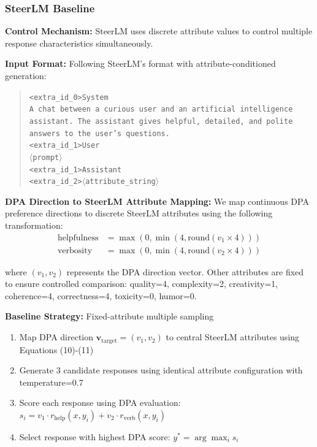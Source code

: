 \documentclass{article} %
\begin{document}
\subsubsection{SteerLM Baseline}

\textbf{Control Mechanism:} SteerLM uses discrete attribute values to control multiple response characteristics simultaneously.

\textbf{Input Format:} Following SteerLM's format with attribute-conditioned generation:
\begin{quote}
\texttt{<extra\_id\_0>System} \\
\texttt{A chat between a curious user and an artificial intelligence assistant. The assistant gives helpful, detailed, and polite answers to the user's questions.} \\
\texttt{<extra\_id\_1>User} \\
\texttt{$\langle$prompt$\rangle$} \\
\texttt{<extra\_id\_1>Assistant} \\
\texttt{<extra\_id\_2>$\langle$attribute\_string$\rangle$}
\end{quote}

\textbf{DPA Direction to SteerLM Attribute Mapping:} We map continuous DPA preference directions to discrete SteerLM attributes using the following transformation:
\begin{align}
\text{helpfulness} &= \max(0, \min(4, \text{round}(v_1 \times 4))) \\
\text{verbosity} &= \max(0, \min(4, \text{round}(v_2 \times 4)))
\end{align}

where $(v_1, v_2)$ represents the DPA direction vector. Other attributes are fixed to ensure controlled comparison: quality=4, complexity=2, creativity=1, coherence=4, correctness=4, toxicity=0, humor=0.

\textbf{Baseline Strategy:} Fixed-attribute multiple sampling
\begin{enumerate}
    \item Map DPA direction $\mathbf{v}_{\text{target}} = (v_1, v_2)$ to central SteerLM attributes using Equations (10)-(11)
    \item Generate 3 candidate responses using identical attribute configuration with temperature=0.7
    \item Score each response using DPA evaluation: $s_i = v_1 \cdot r_{\text{help}}(x, y_i) + v_2 \cdot r_{\text{verb}}(x, y_i)$
    \item Select response with highest DPA score: $y^* = \arg\max_i s_i$
\end{enumerate}
\end{document}
